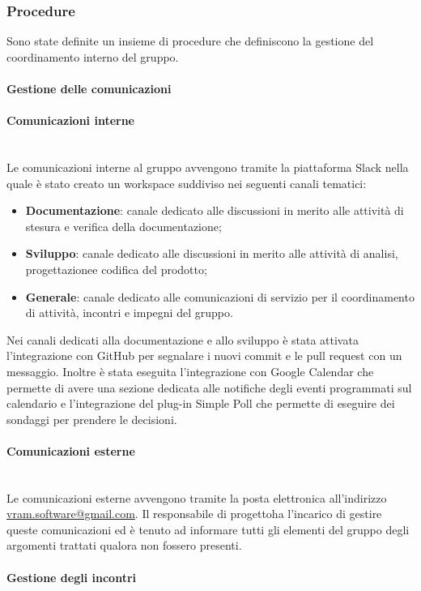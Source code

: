 		\subsubsection{Procedure}
		Sono state definite un insieme di procedure che definiscono la gestione del coordinamento interno del gruppo.
		\paragraph{Gestione delle comunicazioni}
			\paragraph*{Comunicazioni interne}\mbox{}\\ [1mm]
				Le comunicazioni interne al gruppo avvengono tramite la piattaforma Slack nella quale è stato creato un workspace suddiviso nei seguenti canali tematici:
				\begin{itemize}
					\item \textbf{Documentazione}: canale dedicato alle discussioni in merito alle attività di stesura e verifica della documentazione;
					\item \textbf{Sviluppo}: canale dedicato alle discussioni in merito alle attività di analisi, progettazione\glosp e codifica del prodotto\glo;
					\item \textbf{Generale}: canale dedicato alle comunicazioni di servizio per il coordinamento di attività, incontri e impegni del gruppo.
				\end{itemize}
				Nei canali dedicati alla documentazione e allo sviluppo è stata attivata l'integrazione con GitHub per segnalare i nuovi commit e le pull request con un messaggio.
				Inoltre è stata eseguita l'integrazione con Google Calendar che permette di avere una sezione dedicata alle notifiche degli eventi programmati sul calendario e l'integrazione del plug-in Simple Poll che permette di eseguire dei sondaggi per prendere le decisioni.
			\paragraph*{Comunicazioni esterne}\mbox{}\\ [1mm]
				Le comunicazioni esterne avvengono tramite la posta elettronica all'indirizzo \url{vram.software@gmail.com}.
				Il responsabile di progetto\glosp ha l'incarico di gestire queste comunicazioni ed è tenuto ad informare tutti gli elementi del gruppo degli argomenti trattati qualora non fossero presenti.
		\paragraph{Gestione degli incontri}

